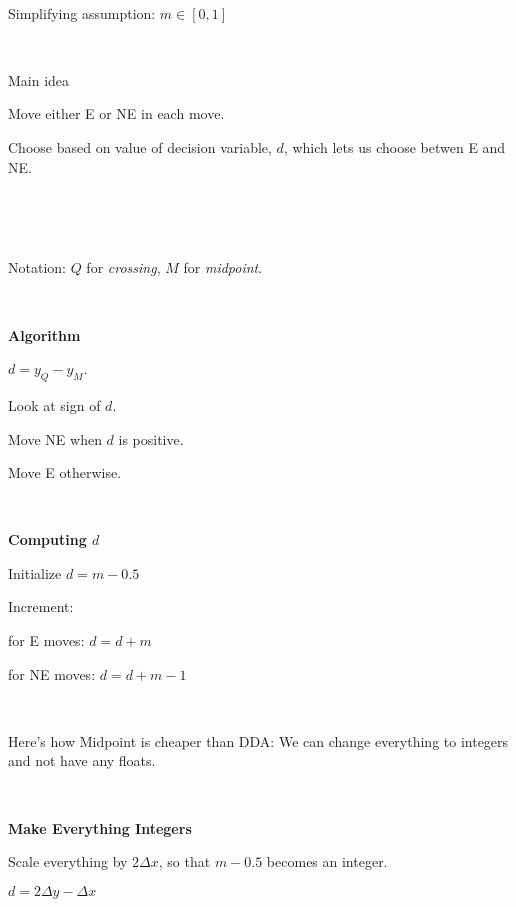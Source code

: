 \documentclass[12pt]{article}
\begin{document}
\begin{spacing}{1.2}
\

Simplifying assumption:  $m \in [0,1]$

\

Main idea

\qquad Move either E or NE in each move.  

\qquad Choose based on value of decision variable, $d$, which lets us choose betwen E and NE.  

\

\

\hfil{}

Notation:   $Q$ for {\it crossing}, $M$ for {\it midpoint}.

\

{\bf Algorithm}

$d = y_Q - y_M$.  

Look at sign of $d$.  

Move NE when $d$ is positive.

Move E otherwise.  

\

{\bf Computing $d$}

Initialize $d = m - 0.5$

Increment:

\qquad for E moves:  $d = d+m$

\qquad for NE moves:  $d = d + m - 1$

\

Here's how Midpoint is cheaper than DDA:  We can change everything to integers and not have any floats.  

\

{\bf Make Everything Integers}

Scale everything by $2 \Delta x$, so that $m - 0.5$ becomes an integer.  

$d = 2 \Delta y - \Delta x$


\end{spacing}
\end{document}
